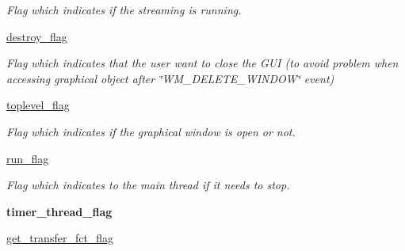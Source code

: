 \begin{DoxyCompactItemize}
\begin{DoxyCompactList}\small\item\em Flag which indicates if the streaming is running. \end{DoxyCompactList}\item 
\mbox{\label{classwatchman_1_1_watchman__main__window_af052cb05a64993a264845c315adec90f}} 
\mbox{\hyperlink{classwatchman_1_1_watchman__main__window_af052cb05a64993a264845c315adec90f}{destroy\+\_\+flag}}
\begin{DoxyCompactList}\small\item\em Flag which indicates that the user want to close the G\+UI (to avoid problem when accessing graphical object after \char`\"{}\+W\+M\+\_\+\+D\+E\+L\+E\+T\+E\+\_\+\+W\+I\+N\+D\+O\+W\char`\"{} event) \end{DoxyCompactList}\item 
\mbox{\label{classwatchman_1_1_watchman__main__window_ae90b59be8f712831ff2a5a9002254736}} 
\mbox{\hyperlink{classwatchman_1_1_watchman__main__window_ae90b59be8f712831ff2a5a9002254736}{toplevel\+\_\+flag}}
\begin{DoxyCompactList}\small\item\em Flag which indicates if the graphical window is open or not. \end{DoxyCompactList}\item 
\mbox{\label{classwatchman_1_1_watchman__main__window_a368aa3e2ce00b599672a3d07c79ff2b7}} 
\mbox{\hyperlink{classwatchman_1_1_watchman__main__window_a368aa3e2ce00b599672a3d07c79ff2b7}{run\+\_\+flag}}
\begin{DoxyCompactList}\small\item\em Flag which indicates to the main thread if it needs to stop. \end{DoxyCompactList}\item 
\mbox{\label{classwatchman_1_1_watchman__main__window_a5702507d1b28f4c702ea7ac21fe3838d}} 
{\bfseries timer\+\_\+thread\+\_\+flag}
\item 
\mbox{\label{classwatchman_1_1_watchman__main__window_ae25e348d78206fb78fc5770590d2ceb6}} 
\mbox{\hyperlink{classwatchman_1_1_watchman__main__window_ae25e348d78206fb78fc5770590d2ceb6}{get\+\_\+transfer\+\_\+fct\+\_\+flag}}

\end{DoxyCompactItemize}
